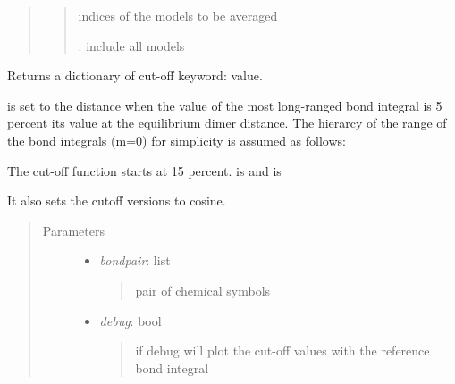 \documentclass[letterpaper,10pt,english]{sphinxmanual}
\begin{document}
\begin{fulllineitems}
\begin{fulllineitems}
\begin{quote}
\begin{description}
\begin{itemize}
\begin{quote}
indices of the models to be averaged

 : include all models
\end{quote}

\end{itemize}

\end{description}\end{quote}

\end{fulllineitems}


\begin{fulllineitems}
\label{classes:catparam.CATParam.calc_rcut}
Returns a dictionary of cut-off keyword: value.

 is set to the distance when the value of the most long-ranged 
bond integral is 5 percent its value at the equilibrium 
dimer distance. The hierarcy of the range of the bond integrals (m=0)
for simplicity is assumed as follows:


The cut-off function starts at 15 percent.  is 
 and  is 

It also sets the cutoff versions to cosine.
\begin{quote}\begin{description}
\item[{Parameters}] \leavevmode\begin{itemize}
\item {} 
\emph{bondpair}: list
\begin{quote}

pair of chemical symbols
\end{quote}

\item {} 
\emph{debug}: bool
\begin{quote}

if debug will plot the cut-off values with the reference 
bond integral
\end{quote}

\end{itemize}

\end{description}\end{quote}


\end{fulllineitems}
\end{fulllineitems}
\end{document}
